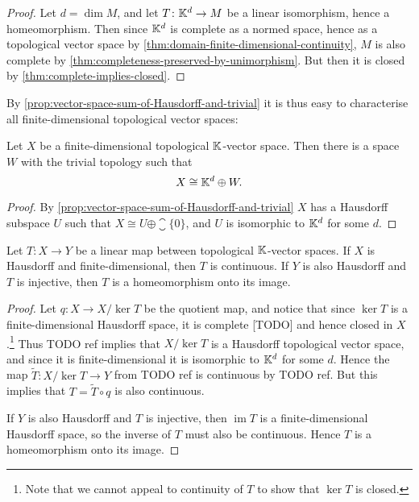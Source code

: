 \documentclass[article, a4paper, 11pt, oneside]{memoir}
\numberwithin{equation}{chapter}
\begin{document}
\begin{proof}
    Let $d = \dim M$, and let $T \colon \mathbb{K}^d \to M$ be a linear isomorphism, hence a homeomorphism. Then since $\mathbb{K}^d$ is complete as a normed space, hence as a topological vector space by \cref{thm:domain-finite-dimensional-continuity}, $M$ is also complete by \cref{thm:completeness-preserved-by-unimorphism}. But then it is closed by \cref{thm:complete-implies-closed}.
\end{proof}


By \cref{prop:vector-space-sum-of-Hausdorff-and-trivial} it is thus easy to characterise all finite-dimensional topological vector spaces:

\begin{corollary}
    Let $X$ be a finite-dimensional topological $\mathbb{K}$-vector space. Then there is a space $W$ with the trivial topology such that
    \begin{equation*}
        X
            \cong \mathbb{K}^d \oplus W.
    \end{equation*}
\end{corollary}

\begin{proof}
    By \cref{prop:vector-space-sum-of-Hausdorff-and-trivial} $X$ has a Hausdorff subspace $U$ such that $X \cong U \oplus \closure{\{0\}}$, and $U$ is isomorphic to $\mathbb{K}^d$ for some $d$.
\end{proof}









\newcommand{\im}{\operatorname{im}}

\begin{theorem}
    \label{thm:domain-finite-dimensional-continuity}
    Let $T \colon X \to Y$ be a linear map between topological $\mathbb{K}$-vector spaces. If $X$ is Hausdorff and finite-dimensional, then $T$ is continuous. If $Y$ is also Hausdorff and $T$ is injective, then $T$ is a homeomorphism onto its image.
\end{theorem}

\begin{proof}
    Let $q \colon X \to X/\ker T$ be the quotient map, and notice that since $\ker T$ is a finite-dimensional Hausdorff space, it is complete [TODO] and hence closed in $X$.\footnote{Note that we cannot appeal to continuity of $T$ to show that $\ker T$ is closed.} Thus TODO ref implies that $X/\ker T$ is a Hausdorff topological vector space, and since it is finite-dimensional it is isomorphic to $\mathbb{K}^d$ for some $d$. Hence the map $\tilde{T} \colon X/\ker T \to Y$ from TODO ref is continuous by TODO ref. But this implies that $T = \tilde{T} \circ q$ is also continuous.

    If $Y$ is also Hausdorff and $T$ is injective, then $\im T$ is a finite-dimensional Hausdorff space, so the inverse of $T$ must also be continuous. Hence $T$ is a homeomorphism onto its image.
\end{proof}
\end{document}
